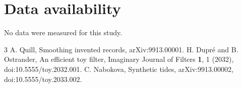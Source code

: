 \documentclass[aps,prd,twocolumn,nofootinbib]{revtex4-2}
\begin{document}
\section*{Data availability}
No data were measured for this study.

\begin{thebibliography}{3}
   A. Quill, Smoothing invented records, arXiv:9913.00001.
   H. Dupré and B. Ostrander, An efficient toy filter, Imaginary Journal of Filters \textbf{1}, 1 (2032), doi:10.5555/toy.2032.001.
   C. Nabokova, Synthetic tides, arXiv:9913.00002, doi:10.5555/toy.2033.002.
\end{thebibliography}
\end{document}
